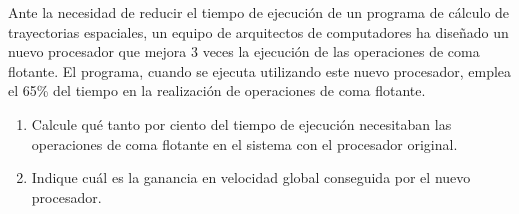 \begin{ejercicio}
Ante la necesidad de reducir el tiempo de ejecución de un programa de cálculo de trayectorias espaciales, un equipo de arquitectos de computadores ha diseñado un nuevo procesador que mejora 3 veces la ejecución de las operaciones de coma flotante. El programa, cuando se ejecuta utilizando este nuevo procesador, emplea el 65\% del tiempo en la realización de operaciones de coma flotante.
\begin{enumerate}
    \item Calcule qué tanto por ciento del tiempo de ejecución necesitaban las operaciones de coma flotante en el sistema con el procesador original.
    \item Indique cuál es la ganancia en velocidad global conseguida por el nuevo procesador.
\end{enumerate}
\end{ejercicio}

